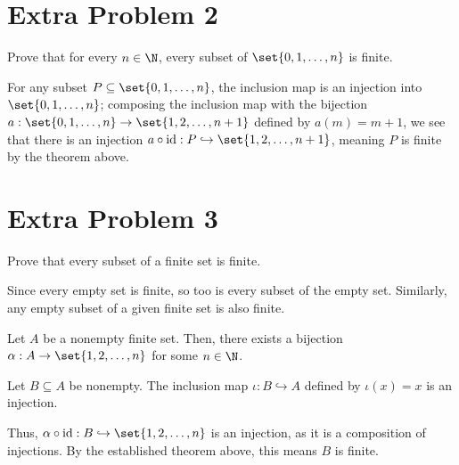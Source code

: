\documentclass[11pt]{mypackage}
\begin{document}
\section{Extra Problem 2}%
\begin{problem}
  Prove that for every $n\in \N$, every subset of $\set{0,1,\dots,n}$ is finite.
\end{problem}
\begin{solution}
  For any subset $P\subseteq \set{0,1,\dots,n}$, the inclusion map is an injection into $\set{0,1,\dots,n}$; composing the inclusion map with the bijection $a: \set{0,1,\dots,n} \rightarrow \set{1,2,\dots,n+1}$ defined by $a(m) = m+1$, we see that there is an injection $a\circ \text{id}: P\hookrightarrow \set{1,2,\dots,n+1}$, meaning $P$ is finite by the theorem above.
\end{solution}

\section{Extra Problem 3}%
\begin{problem}
  Prove that every subset of a finite set is finite.
\end{problem}
\begin{solution}
  Since every empty set is finite, so too is every subset of the empty set. Similarly, any empty subset of a given finite set is also finite.\newline

  Let $A$ be a nonempty finite set. Then, there exists a bijection $\alpha: A\rightarrow \set{1,2,\dots,n}$ for some $n\in\N$.\newline

  Let $B\subseteq A$ be nonempty. The inclusion map $\iota: B\hookrightarrow A$ defined by $\iota(x) = x$ is an injection.\newline

  Thus, $\alpha \circ \text{id}: B\hookrightarrow \set{1,2,\dots,n}$ is an injection, as it is a composition of injections. By the established theorem above, this means $B$ is finite.
\end{solution}
\end{document}
